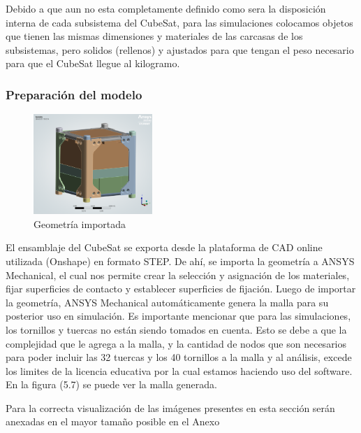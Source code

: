     Debido a que aun no esta completamente definido como sera la disposición interna de
    cada subsistema del CubeSat, para las simulaciones colocamos objetos que tienen las mismas
    dimensiones y materiales de las carcasas de los subsistemas, pero solidos (rellenos) y ajustados
    para que tengan el peso necesario para que el CubeSat llegue al kilogramo.

    \subsubsection{Preparación del modelo}

      \noindent
      \begin{minipage}{\textwidth}
        \begin{figure}
          \centering
          \includegraphics[width=0.4\textwidth]{image/fem/ansys_cubesat-geometry.png}
          \caption{Geometría importada}
          \label{fig:fem_geo}
        \end{figure}
        \hspace*{2em}
        El ensamblaje del CubeSat se exporta desde la plataforma de CAD online utilizada (Onshape) en formato
        STEP. De ahí, se importa la geometría a ANSYS Mechanical, el cual nos permite crear la selección
        y asignación de los materiales, fijar superficies de contacto y
        establecer superficies de fijación. Luego de importar la geometría, ANSYS Mechanical
        automáticamente genera la malla para su posterior uso en simulación.
        Es importante mencionar que para las simulaciones, los
        tornillos y tuercas no están siendo tomados en cuenta. Esto se debe a que la complejidad que le agrega
        a la malla, y la cantidad de nodos que son necesarios para poder incluir las 32 tuercas y los 40 tornillos a
        la malla y al análisis, excede los limites de la licencia
        educativa por la cual estamos haciendo uso del software. En la figura (5.7) se puede ver la malla generada.

        Para la correcta visualización de las imágenes presentes en esta sección serán anexadas en el mayor tamaño
        posible en el Anexo
      \end{minipage}

